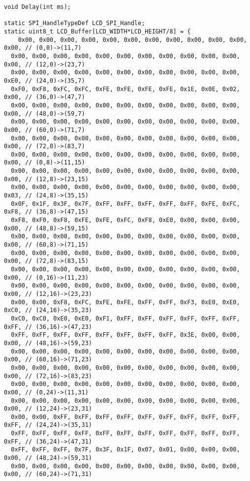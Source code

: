 \documentclass[oneside,14pt]{extarticle}
\begin{document}
\begin{normalsize}
{\begin{lstlisting}
void Delay(int ms);

static SPI_HandleTypeDef LCD_SPI_Handle;
static uint8_t LCD_Buffer[LCD_WIDTH*LCD_HEIGHT/8] = {
	0x00, 0x00, 0x00, 0x00, 0x00, 0x00, 0x00, 0x00, 0x00, 0x00, 0x00, 0x00, // (0,0)->(11,7)
  0x00, 0x00, 0x00, 0x00, 0x00, 0x00, 0x00, 0x00, 0x00, 0x00, 0x00, 0x00, // (12,0)->(23,7)
  0x00, 0x00, 0x00, 0x00, 0x00, 0x00, 0x00, 0x00, 0x00, 0x00, 0x00, 0xE0, // (24,0)->(35,7)
  0xF0, 0xF8, 0xFC, 0xFC, 0xFE, 0xFE, 0xFE, 0xFE, 0x1E, 0x0E, 0x02, 0x00, // (36,0)->(47,7)
  0x00, 0x00, 0x00, 0x00, 0x00, 0x00, 0x00, 0x00, 0x00, 0x00, 0x00, 0x00, // (48,0)->(59,7)
  0x00, 0x00, 0x00, 0x00, 0x00, 0x00, 0x00, 0x00, 0x00, 0x00, 0x00, 0x00, // (60,0)->(71,7)
  0x00, 0x00, 0x00, 0x00, 0x00, 0x00, 0x00, 0x00, 0x00, 0x00, 0x00, 0x00, // (72,0)->(83,7)
  0x00, 0x00, 0x00, 0x00, 0x00, 0x00, 0x00, 0x00, 0x00, 0x00, 0x00, 0x00, // (0,8)->(11,15)
  0x00, 0x00, 0x00, 0x00, 0x00, 0x00, 0x00, 0x00, 0x00, 0x00, 0x00, 0x00, // (12,8)->(23,15)
  0x00, 0x00, 0x00, 0x00, 0x00, 0x00, 0x00, 0x00, 0x00, 0x00, 0x00, 0x03, // (24,8)->(35,15)
  0x0F, 0x1F, 0x3F, 0x7F, 0xFF, 0xFF, 0xFF, 0xFF, 0xFF, 0xFE, 0xFC, 0xF8, // (36,8)->(47,15)
  0xF8, 0xF0, 0xF8, 0xFE, 0xFE, 0xFC, 0xF8, 0xE0, 0x00, 0x00, 0x00, 0x00, // (48,8)->(59,15)
  0x00, 0x00, 0x00, 0x00, 0x00, 0x00, 0x00, 0x00, 0x00, 0x00, 0x00, 0x00, // (60,8)->(71,15)
  0x00, 0x00, 0x00, 0x00, 0x00, 0x00, 0x00, 0x00, 0x00, 0x00, 0x00, 0x00, // (72,8)->(83,15)
  0x00, 0x00, 0x00, 0x00, 0x00, 0x00, 0x00, 0x00, 0x00, 0x00, 0x00, 0x00, // (0,16)->(11,23)
  0x00, 0x00, 0x00, 0x00, 0x00, 0x00, 0x00, 0x00, 0x00, 0x00, 0x00, 0x00, // (12,16)->(23,23)
  0x00, 0x00, 0xF8, 0xFC, 0xFE, 0xFE, 0xFF, 0xFF, 0xF3, 0xE0, 0xE0, 0xC0, // (24,16)->(35,23)
  0xC0, 0xC0, 0xE0, 0xE0, 0xF1, 0xFF, 0xFF, 0xFF, 0xFF, 0xFF, 0xFF, 0xFF, // (36,16)->(47,23)
  0xFF, 0xFF, 0xFF, 0xFF, 0xFF, 0xFF, 0xFF, 0xFF, 0x3E, 0x00, 0x00, 0x00, // (48,16)->(59,23)
  0x00, 0x00, 0x00, 0x00, 0x00, 0x00, 0x00, 0x00, 0x00, 0x00, 0x00, 0x00, // (60,16)->(71,23)
  0x00, 0x00, 0x00, 0x00, 0x00, 0x00, 0x00, 0x00, 0x00, 0x00, 0x00, 0x00, // (72,16)->(83,23)
  0x00, 0x00, 0x00, 0x00, 0x00, 0x00, 0x00, 0x00, 0x00, 0x00, 0x00, 0x00, // (0,24)->(11,31)
  0x00, 0x00, 0x00, 0x00, 0x00, 0x00, 0x00, 0x00, 0x00, 0x00, 0x00, 0x00, // (12,24)->(23,31)
  0x00, 0x00, 0xFF, 0xFF, 0xFF, 0xFF, 0xFF, 0xFF, 0xFF, 0xFF, 0xFF, 0xFF, // (24,24)->(35,31)
  0xFF, 0xFF, 0xFF, 0xFF, 0xFF, 0xFF, 0xFF, 0xFF, 0xFF, 0xFF, 0xFF, 0xFF, // (36,24)->(47,31)
  0xFF, 0xFF, 0xFF, 0x7F, 0x3F, 0x1F, 0x07, 0x01, 0x00, 0x00, 0x00, 0x00, // (48,24)->(59,31)
  0x00, 0x00, 0x00, 0x00, 0x00, 0x00, 0x00, 0x00, 0x00, 0x00, 0x00, 0x00, // (60,24)->(71,31)

\end{lstlisting}}
\end{normalsize}
\end{document}
